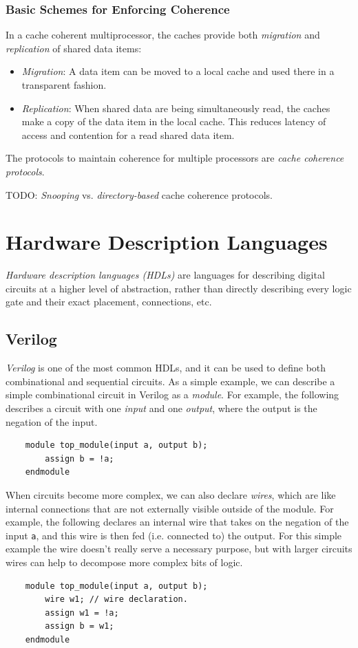 \documentclass[10pt,a4paper]{article}
\begin{document}
\subsubsection*{Basic Schemes for Enforcing Coherence}

In a cache coherent multiprocessor, the caches provide both \textit{migration} and \textit{replication} of shared data items:
\begin{itemize}
    \item \textit{Migration}: A data item can be moved to a local cache and used there in a transparent fashion.
    \item \textit{Replication}: When shared data are being simultaneously read, the caches make a copy of the data item in the local cache. This reduces latency of access and contention for a read shared data item.
\end{itemize}
The protocols to maintain coherence for multiple processors are \textit{cache coherence protocols}.

TODO: \textit{Snooping} vs. \textit{directory-based} cache coherence protocols.
 
\section{Hardware Description Languages}


\textit{Hardware description languages (HDLs)} are languages for describing digital circuits at a higher level of abstraction, rather than directly describing every logic gate and their exact placement, connections, etc. 

\subsection*{Verilog}

\textit{Verilog} is one of the most common HDLs, and it can be used to define both combinational and sequential circuits. As a simple example, we can describe a simple combinational circuit in Verilog as a \textit{module}. For example, the following describes a circuit with one \textit{input} and one \textit{output}, where the output is the negation of the input.
\begin{verbatim}
    module top_module(input a, output b);
        assign b = !a;
    endmodule
\end{verbatim}
When circuits become more complex, we can also declare \textit{wires}, which are like internal connections that are not externally visible outside of the module. For example, the following declares an internal wire that takes on the negation of the input \verb|a|, and this wire is then fed (i.e. connected to) the output. For this simple example the wire doesn't really serve a necessary purpose, but with larger circuits wires can help to decompose more complex bits of logic.
\begin{verbatim}
    module top_module(input a, output b);
        wire w1; // wire declaration.
        assign w1 = !a;
        assign b = w1;
    endmodule
\end{verbatim}



\end{document}
